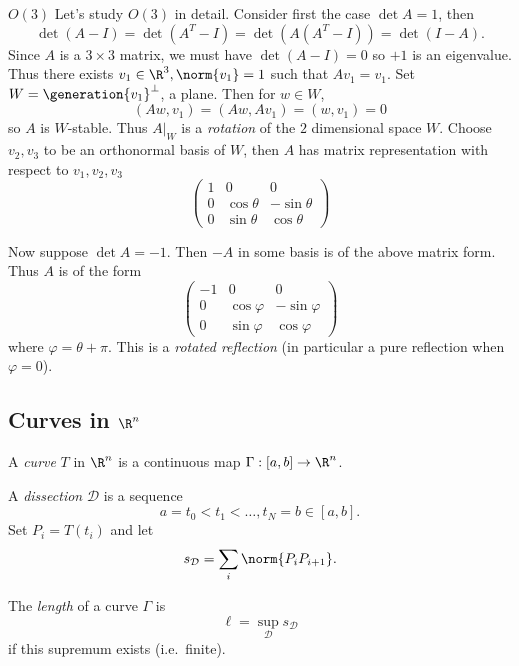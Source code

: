 \documentclass[a4paper]{article}
\theoremstyle{definition}
\begin{document}
\begin{eg}{\(O(3)\)}
Let's study \(O(3)\) in detail. Consider first the case \(\det A = 1\), then
\[
  \det(A - I) = \det(A^T -I) = \det(A(A^T - I)) = \det(I - A).
\]
Since \(A\) is a \(3 \times 3\) matrix, we must have \(\det (A - I) = 0\) so \(+1\) is an eigenvalue. Thus there exists \(v_1 \in \R^3, \norm{v_1} = 1\) such that \(Av_1 = v_1\). Set \(W = \generation{v_1}^\perp\), a plane. Then for \(w \in W\),
\[
  (Aw, v_1) = (Aw, Av_1) = (w, v_1) = 0
\]
so \(A\) is \(W\)-stable. Thus \(A|_W\) is a \emph{rotation} of the \(2\) dimensional space \(W\). Choose \(v_2, v_3\) to be an orthonormal basis of \(W\), then \(A\) has matrix representation with respect to \(v_1, v_2, v_3\)
\[
  \begin{pmatrix}
    1 & 0 & 0 \\
    0 & \cos \theta & -\sin \theta \\
    0 & \sin \theta & \cos \theta
  \end{pmatrix}
\]

Now suppose \(\det A = -1\). Then \(-A\) in some basis is of the above matrix form. Thus \(A\) is of the form
\[
  \begin{pmatrix}
    -1 & 0 & 0 \\
    0 & \cos \varphi & -\sin \varphi \\
    0 & \sin \varphi & \cos \varphi
  \end{pmatrix}
\]
where \(\varphi = \theta + \pi\). This is a \emph{rotated reflection} (in particular a pure reflection when \(\varphi = 0\)).
\end{eg}

\subsection{Curves in \texorpdfstring{\(\R^n\)}{ℝ\^{}n}}

\begin{definition}[Curve]
  A \emph{curve} \(T\) in \(\R^n\) is a continuous map \(\Gamma: [a, b] \to \R^n\).
\end{definition}

A \emph{dissection} \(\mathcal D\) is a sequence
\[
  a = t_0 < t_1 < \dots, t_N = b \in [a, b].
\]
Set \(P_i = T(t_i)\) and let
\[
  s_{\mathcal D} = \sum_i \norm{P_iP_{i + 1}}.
\]

\begin{definition}[Length]
  The \emph{length} of a curve \(\Gamma\) is
  \[
    \ell = \sup_{\mathcal D} s_{\mathcal D}
  \]
  if this supremum exists (i.e.\ finite).
\end{definition}
\end{document}
